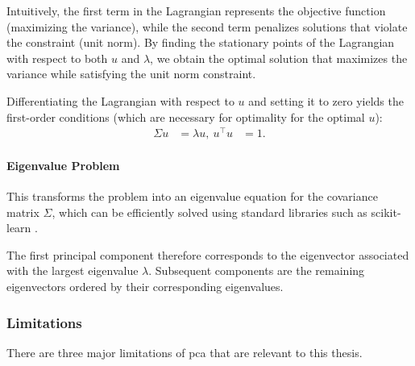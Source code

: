 Intuitively, the first term in the Lagrangian represents the objective function (maximizing the variance), while the second term penalizes solutions that violate the constraint (unit norm). By finding the stationary points of the Lagrangian with respect to both $u$ and $\lambda$, we obtain the optimal solution that maximizes the variance while satisfying the unit norm constraint.

Differentiating the Lagrangian with respect to $u$ and setting it to zero yields the first-order conditions (which are necessary for optimality for the optimal $u$):
\begin{align}
\Sigma u & = \lambda u, \
u^\top u & = 1.
\end{align}

\paragraph{Eigenvalue Problem}

This transforms the problem into an eigenvalue equation for the covariance matrix \(\Sigma\), which can be efficiently solved using standard libraries such as scikit-learn \citep{pedregosa2011scikit}.

The first principal component therefore corresponds to the eigenvector associated with the largest eigenvalue \(\lambda\).
Subsequent components are the remaining eigenvectors ordered by their corresponding eigenvalues.

\subsubsection{Limitations}
There are three major limitations of \acrshort{pca} that are relevant to this thesis.


